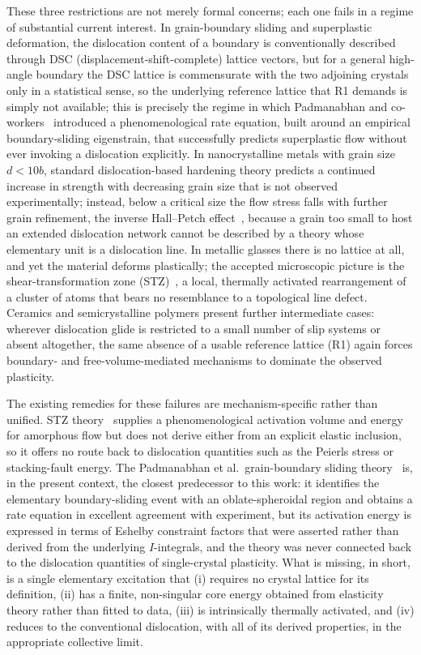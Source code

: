 \documentclass[5p,sort&compress]{elsarticle}
\begin{document}
These three restrictions are not merely formal concerns; each one
fails in a regime of substantial current interest. In grain-boundary
sliding and superplastic deformation, the dislocation content of a
boundary is conventionally described through DSC
(displacement-shift-complete) lattice vectors, but for a general
high-angle boundary the DSC lattice is commensurate with the two
adjoining crystals only in a statistical sense, so the underlying
reference lattice that R1 demands is simply not available; this is
precisely the regime in which Padmanabhan and
co-workers~\cite{pad-part1,padgleiter2014,paddivinski2024} introduced a
phenomenological rate equation, built around an empirical
boundary-sliding eigenstrain, that successfully predicts superplastic
flow without ever invoking a dislocation explicitly. In nanocrystalline
metals with grain size $d<10b$, standard dislocation-based hardening
theory predicts a continued increase in strength with decreasing grain
size that is not observed experimentally; instead, below a critical
size the flow stress falls with further grain refinement, the inverse
Hall--Petch effect~\cite{schiotz1998}, because a grain too small to
host an extended dislocation network cannot be described by a theory
whose elementary unit is a dislocation line. In metallic glasses there
is no lattice at all, and yet the material deforms plastically; the
accepted microscopic picture is the shear-transformation zone
(STZ)~\cite{argon1979,falk-langer1998}, a local, thermally activated
rearrangement of a cluster of atoms that bears no resemblance to a
topological line defect. Ceramics and semicrystalline polymers present
further intermediate cases: wherever dislocation glide is restricted
to a small number of slip systems or absent altogether, the same
absence of a usable reference lattice (R1) again forces boundary- and
free-volume-mediated mechanisms to dominate the observed plasticity.

The existing remedies for these failures are mechanism-specific rather
than unified. STZ theory~\cite{argon1979,falk-langer1998} supplies a
phenomenological activation volume and energy for amorphous flow but
does not derive either from an explicit elastic inclusion, so it
offers no route back to dislocation quantities such as the Peierls
stress or stacking-fault energy. The Padmanabhan et al.\ grain-boundary
sliding theory~\cite{pad-part1} is, in the present context, the
closest predecessor to this work: it identifies the elementary
boundary-sliding event with an oblate-spheroidal region and obtains a
rate equation in excellent agreement with experiment, but its
activation energy is expressed in terms of Eshelby constraint factors
that were asserted rather than derived from the underlying $I$-integrals,
and the theory was never connected back to the dislocation quantities
of single-crystal plasticity. What is missing, in short, is a single
elementary excitation that (i) requires no crystal lattice for its
definition, (ii) has a finite, non-singular core energy obtained from
elasticity theory rather than fitted to data, (iii) is intrinsically
thermally activated, and (iv) reduces to the conventional dislocation,
with all of its derived properties, in the appropriate collective
limit.
\end{document}
